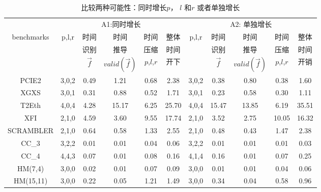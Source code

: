 \begin{table}[t]%
\caption{比较两种可能性：同时增长$p$， $l$ 和$r$ 或者单独增长}
\centering
\label{tab:comparing_simu_sepa}
\begin{tabular}{|c|c|c|c|c|c|c|c|c|c|c|}
\hline
                   & \multicolumn{5}{|c|}{A1:同时增长}                          &  \multicolumn{5}{|c|}{A2: 单独增长}           \\\cline{2-11}
benchmarks         & p,l,r& 时间       & 时间            & 时间       &  整体   & p,l,r& 时间       & 时间            & 时间       & 整体  \\
                   &      & 识别       & 推导            & 压缩       &  时间   &      & 识别       & 推导            & 压缩       & 时间   \\
                   &      & $\vec{f}$  & $valid(\vec{f})$& $p$,$l$,$r$&  开下   &      & $\vec{f}$  & $valid(\vec{f})$& $p$,$l$,$r$& 开销   \\\hline\hline
PCIE2              & 3,0,2& 0.49       & 1.21            & 0.68       &  2.38   & 3,0,2& 0.38       & 0.80            & 0.38       & 1.60   \\\hline
XGXS               & 3,0,1& 0.31       & 0.88            & 0.52       &  1.71   & 3,0,1& 0.23       & 0.58            & 0.30       & 1.11   \\\hline
T2Eth              & 4,0,4& 4.28       & 15.17           & 6.25       &  25.70  & 4,0,4& 15.47      & 13.85           & 6.19       & 35.51  \\\hline
XFI                & 2,1,0& 4.59       & 3.60            & 9.55       & 17.74   & 2,1,0& 3.52       & 2.75            & 10.05      & 16.32  \\\hline
SCRAMBLER          & 2,1,0& 0.64       & 0.58            & 1.33       & 2.55    & 2,1,0& 0.48       & 0.43            & 1.47       & 2.38   \\\hline
CC\_3              & 3,2,2& 0.01       & 0.01            & 0.04       & 0.06    & 3,2,2& 0.01       & 0.01            & 0.01       & 0.03   \\\hline
CC\_4              & 4,4,3& 0.07       & 0.01            & 0.08       & 0.16    & 4,1,4& 0.16       & 0.01            & 0.07       & 0.25   \\\hline
HM(7,4)            & 3,0,0& 0.02       & 0.01            & 0.07       & 0.09    & 3,0,0& 0.01       & 0.01            & 0.04       & 0.06   \\\hline
HM(15,11)          & 3,0,0& 0.22       & 0.05            & 1.21       & 1.49    & 3,0,0& 0.34       & 0.04            & 0.58       & 0.96   \\\hline
\end{tabular}
\end{table}%

